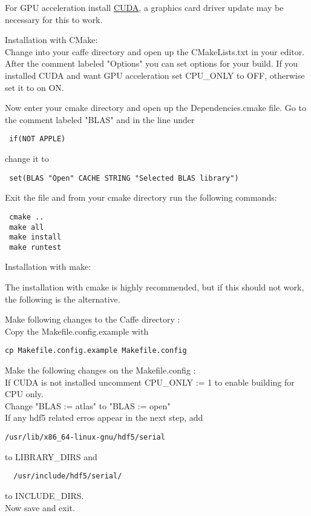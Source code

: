 \documentclass[main.tex]{subfiles}
\begin{document}
 For GPU acceleration install \href{https://docs.nvidia.com/cuda/cuda-installation-guide-linux/index.html#ubuntu-installation}{CUDA}, a graphics card driver update may be necessary for this to work.
 
 Installation with CMake:\\
 
 Change into your caffe directory and open up the CMakeLists.txt in your editor. After the comment labeled "Options" you can set options for your build. If you installed CUDA and want GPU acceleration set CPU\_ONLY to OFF, otherwise set it to on ON.
 
 Now enter your cmake directory and open up the Dependencies.cmake file. Go to the comment labeled "BLAS" and in the line under 
 
 \begin{lstlisting}
 if(NOT APPLE)
\end{lstlisting}
 
 change it to 
 
 \begin{lstlisting}
 set(BLAS "Open" CACHE STRING "Selected BLAS library")
\end{lstlisting}
 
 Exit the file and from your cmake directory run the following commands:
 \begin{lstlisting}
 cmake ..
 make all
 make install
 make runtest
\end{lstlisting}

\newpage
 
 
 
 
Installation with make:

The installation with cmake is highly recommended, but if this should not work, the following is the alternative.

 Make following changes to the Caffe directory : \\

Copy the Makefile.config.example with 
\begin{lstlisting}
cp Makefile.config.example Makefile.config
\end{lstlisting}
Make the following changes on the Makefile.config :\\

If CUDA is not installed uncomment CPU\_ONLY := 1 to enable building for CPU only.\\
Change "BLAS := atlas" to "BLAS := open"\\
If any hdf5 related erros appear in the next step, add 
\begin{lstlisting}
/usr/lib/x86_64-linux-gnu/hdf5/serial
\end{lstlisting}
 to LIBRARY\_DIRS and
\begin{lstlisting} 
  /usr/include/hdf5/serial/ 
\end{lstlisting} 
  to INCLUDE\_DIRS.\\
Now save and exit.
\end{document}
